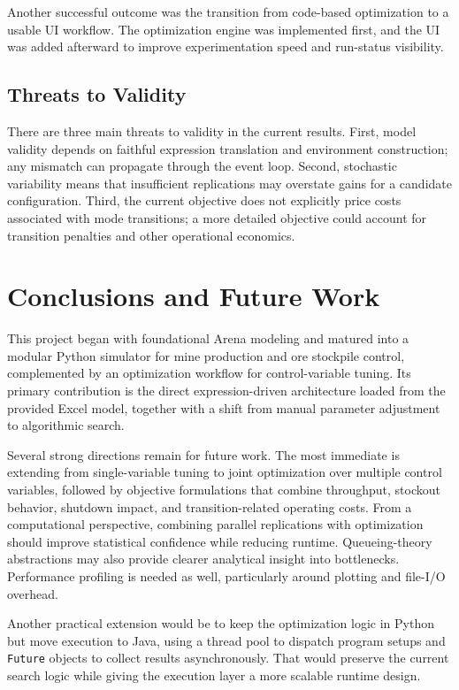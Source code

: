 \documentclass[11pt]{article}
\begin{document}
Another successful outcome was the transition from code-based optimization to a usable UI workflow. The optimization engine was implemented first, and the UI was added afterward to improve experimentation speed and run-status visibility.

\subsection{Threats to Validity}
There are three main threats to validity in the current results. First, model validity depends on faithful expression translation and environment construction; any mismatch can propagate through the event loop. Second, stochastic variability means that insufficient replications may overstate gains for a candidate configuration. Third, the current objective does not explicitly price costs associated with mode transitions; a more detailed objective could account for transition penalties and other operational economics.

\section{Conclusions and Future Work}
This project began with foundational Arena modeling and matured into a modular Python simulator for mine production and ore stockpile control, complemented by an optimization workflow for control-variable tuning. Its primary contribution is the direct expression-driven architecture loaded from the provided Excel model, together with a shift from manual parameter adjustment to algorithmic search.

Several strong directions remain for future work. The most immediate is extending from single-variable tuning to joint optimization over multiple control variables, followed by objective formulations that combine throughput, stockout behavior, shutdown impact, and transition-related operating costs. From a computational perspective, combining parallel replications with optimization should improve statistical confidence while reducing runtime. Queueing-theory abstractions may also provide clearer analytical insight into bottlenecks. Performance profiling is needed as well, particularly around plotting and file-I/O overhead.

Another practical extension would be to keep the optimization logic in Python but move execution to Java, using a thread pool to dispatch program setups and \texttt{Future} objects to collect results asynchronously. That would preserve the current search logic while giving the execution layer a more scalable runtime design.
\end{document}
